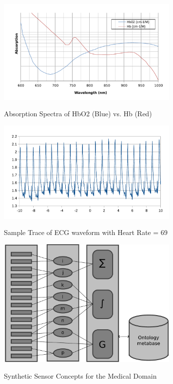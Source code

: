 \begin{figure}
	\begin{center}
		\label{fig:hemoglobin}
		\includegraphics[scale=1,width=0.8\textwidth]{Images/hemoglobin.pdf} 
		\caption{Absorption Spectra of HbO2 (Blue) vs. Hb (Red)}
	\end{center}

\end{figure}

\begin{figure}
	\begin{center}
		\label{fig:HR69}
		\includegraphics[scale=1,width=0.8\textwidth]{Images/HR69.pdf} 
		\caption{Sample Trace of ECG waveform with Heart Rate = 69}
	\end{center}
\end{figure}


\begin{figure}
	\begin{center}
		\label{fig:SyntheticSensor}
		\includegraphics[scale=1,width=0.8\textwidth]{Images/syntheticSensor.pdf} 
		\caption{Synthetic Sensor Concepts for the Medical Domain}
	\end{center}
\end{figure}

